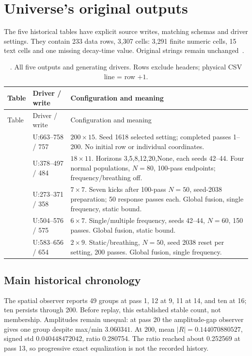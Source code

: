 \section{Universe's original outputs}\label{sec:original}
The five historical tables have explicit source writes, matching schemas and driver settings. They contain 233 data rows, 3,307 cells: 3,291 finite numeric cells, 15 text cells and one missing decay-time value. Original strings remain unchanged~\citep{s7cstudy,s7creview}.

{\small
\begin{longtable}{P{40mm}P{28mm}P{78mm}}
\caption{. All five outputs and generating drivers. Rows exclude headers; physical CSV line = row \(+1\).}\label{tab:drivers}\\
\toprule Table & Driver / write & Configuration and meaning\\\midrule
\endfirsthead\toprule Table & Driver / write & Configuration and meaning\\\midrule\endhead
\protect{} & U:663--758 / 757 & \(200\times15\). Seed 1618 selected setting; completed passes 1--200. No initial row or individual coordinates.\\
\protect{} & U:378--497 / 484 & \(18\times11\). Horizons 3,5,8,12,20,None, each seeds 42--44. Four normal populations, \(N=80\), 100-pass endpoints; frequency/breathing off.\\
\protect{} & U:273--371 / 358 & \(7\times7\). Seven kicks after 100-pass \(N=50\), seed-2038 preparation; 50 response passes each. Global fusion, single frequency, static bound.\\
\protect{} & U:504--576 / 575 & \(6\times7\). Single/multiple frequency, seeds 42--44, \(N=60\), 150 passes. Global fusion, static bound.\\
\protect{} & U:583--656 / 654 & \(2\times9\). Static/breathing, \(N=50\), seed 2038 reset per setting, 200 passes. Global fusion, single frequency.\\
\bottomrule
\end{longtable}}

\subsection{Main historical chronology}
The spatial observer reports 49 groups at pass 1, 12 at 9, 11 at 14, and ten at 16; ten persists through 200. Before replay, this established stable count, not membership. Amplitudes remain unequal: at pass 20 the amplitude-gap observer gives one group despite max/min \(3.060341\). At 200, mean \(|R|=0.144070880527\), signed std \(0.040448472042\), ratio 0.280754. The ratio reached about 0.252569 at pass 13, so progressive exact equalization is not the recorded history.


